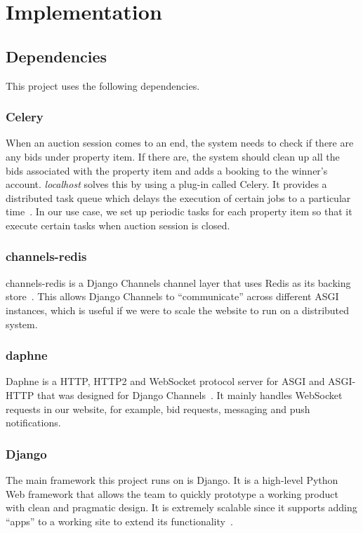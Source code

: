 \section{Implementation}

\subsection{Dependencies}
This project uses the following dependencies.

\subsubsection{Celery}
When an auction session comes to an end, the system needs to check if there are
any bids under property item. If there are, the system should clean up all the
bids associated with the property item and adds a booking to the winner's
account. \emph{localhost} solves this by using a plug-in called Celery. It
provides a distributed task queue which delays the execution of certain jobs to
a particular time~\cite{celery-doc}. In our use case, we set up periodic tasks for each property
item so that it execute certain tasks when auction session is closed.

\subsubsection{channels-redis}
channels-redis is a Django Channels channel layer that uses Redis as its backing
store~\cite{channels-redis-doc}. This allows Django Channels to ``communicate''
across different ASGI instances, which is useful if we were to scale the
website to run on a distributed system.

\subsubsection{daphne}
Daphne is a HTTP, HTTP2 and WebSocket protocol server for ASGI and ASGI-HTTP
that was designed for Django Channels~\cite{daphne}. It mainly handles WebSocket requests in
our website, for example, bid requests, messaging and push notifications.

\subsubsection{Django}
The main framework this project runs on is Django. It is a high-level Python Web
framework that allows the team to quickly prototype a working product with clean
and pragmatic design. It is extremely scalable since it supports adding ``apps''
to a working site to extend its functionality~\cite{django}. %

